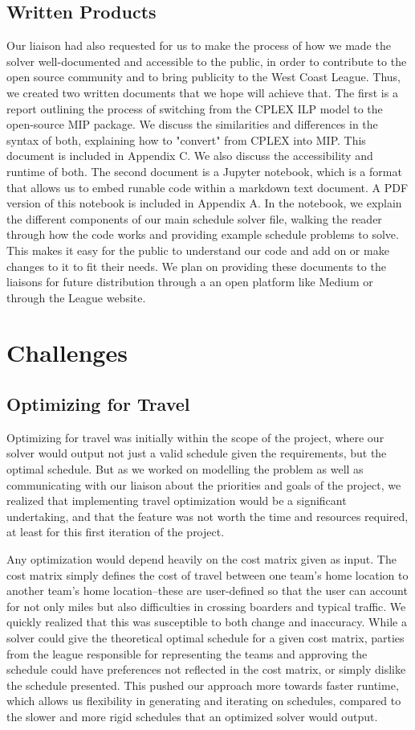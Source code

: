 \documentclass[book]{hmcclinic}
\begin{document}
\section{Written Products}
Our liaison had also requested for us to make the process of how we made the solver well-documented and accessible to the public, in order to contribute to the open source community and to bring publicity to the West Coast League. Thus, we created two written documents that we hope will achieve that. The first is a report outlining the process of switching from the CPLEX ILP model to the open-source MIP package. We discuss the similarities and differences in the syntax of both, explaining how to "convert" from CPLEX into MIP. This document is included in Appendix C. We also discuss the accessibility and runtime of both. The second document is a Jupyter notebook, which is a format that allows us to embed runable code within a markdown text document. A PDF version of this notebook is included in Appendix A. In the notebook, we explain the different components of our main schedule solver file, walking the reader through how the code works and providing example schedule problems to solve. This makes it easy for the public to understand our code and add on or make changes to it to fit their needs. We plan on providing these documents to the liaisons for future distribution through a an open platform like Medium or through the League website. 

\chapter{Challenges}


\section{Optimizing for Travel}
Optimizing for travel was initially within the scope of the project, where our solver would output not just a valid schedule given the requirements, but the optimal schedule. But as we worked on modelling the problem as well as communicating with our liaison about the priorities and goals of the project, we realized that implementing travel optimization would be a significant undertaking, and that the feature was not worth the time and resources required, at least for this first iteration of the project.

Any optimization would depend heavily on the cost matrix given as input. The cost matrix simply defines the cost of travel between one team's home location to another team's home location--these are user-defined so that the user can account for not only miles but also difficulties in crossing boarders and typical traffic. We quickly realized that this was susceptible to both change and inaccuracy. While a solver could give the theoretical optimal schedule for a given cost matrix, parties from the league responsible for representing the teams and approving the schedule could have preferences not reflected in the cost matrix, or simply dislike the schedule presented. This pushed our approach more towards faster runtime, which allows us flexibility in generating and iterating on schedules, compared to the slower and more rigid schedules that an optimized solver would output.
\end{document}
